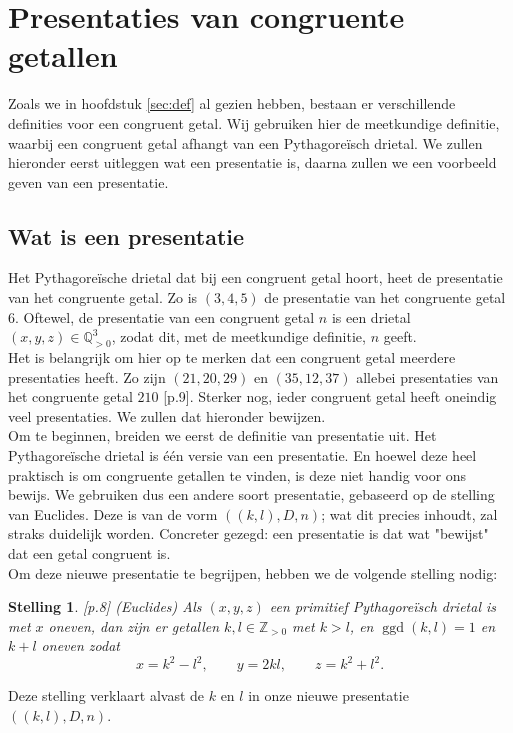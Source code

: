 \documentclass[12pt,reqno]{article}
\newcommand*{\ZZ}{\ensuremath{\mathbb{Z}}}
\newcommand*{\QQ}{\ensuremath{\mathbb{Q}}}
\theoremstyle{theorem}
\newtheorem{theorem}{Stelling}
\theoremstyle{definition}
\DeclareMathOperator{\ggd}{ggd}
\begin{document}
	
	\section{Presentaties van congruente getallen}
	Zoals we in hoofdstuk \ref{sec:def} al gezien hebben, bestaan er verschillende definities voor een congruent getal. Wij gebruiken hier de meetkundige definitie, waarbij een congruent getal afhangt van een Pythagore\"isch drietal. We zullen hieronder eerst uitleggen wat een presentatie is, daarna zullen we een voorbeeld geven van een presentatie.
	
	\subsection{Wat is een presentatie}\label{sec:presentaties}
	Het Pythagore\"ische drietal dat bij een congruent getal hoort, heet de presentatie van het congruente getal. Zo is $(3,4,5)$ de presentatie van het congruente getal $6$. Oftewel,  de presentatie van een congruent getal $n$ is een drietal $(x,y,z)\in\QQ^3_{>0}$, zodat dit, met de meetkundige definitie, $n$ geeft.\\
	
	Het is belangrijk om hier op te merken dat een congruent getal meerdere presentaties heeft. Zo zijn $(21,20,29)$ en $(35,12,37)$ allebei presentaties van het congruente getal $210$ \cite{Oort}[p.9]. Sterker nog, ieder congruent getal heeft oneindig veel presentaties. We zullen dat hieronder bewijzen.\\
	
	Om te beginnen, breiden we eerst de definitie van presentatie uit. Het Pythagore\"ische drietal is \'e\'en versie van een presentatie. En hoewel deze heel praktisch is om congruente getallen te vinden, is deze niet handig voor ons bewijs. We gebruiken dus een andere soort presentatie, gebaseerd op de stelling van Euclides. Deze is van de vorm $((k,l),D,n)$; wat dit precies inhoudt, zal straks duidelijk worden. Concreter gezegd: een presentatie is dat wat "bewijst" dat een getal congruent is.\\
	
	Om deze nieuwe presentatie te begrijpen, hebben we de volgende stelling nodig:
	\begin{theorem}\label{def:euclides}
		\cite{Oort}[p.8] (Euclides) Als $(x,y,z)$ een primitief Pythagore\"isch drietal is met $x$ oneven, dan zijn er getallen $k,l\in\ZZ_{>0}$ met $k>l$, en $\ggd(k,l)=1$ en $k+l$ oneven zodat
		\begin{equation*}
			x=k^2-l^2,\qquad y=2kl,\qquad z=k^2+l^2.
		\end{equation*}
	\end{theorem}
	\noindent Deze stelling verklaart alvast de $k$ en $l$ in onze nieuwe presentatie $((k,l),D,n)$.\\
	
\end{document}
